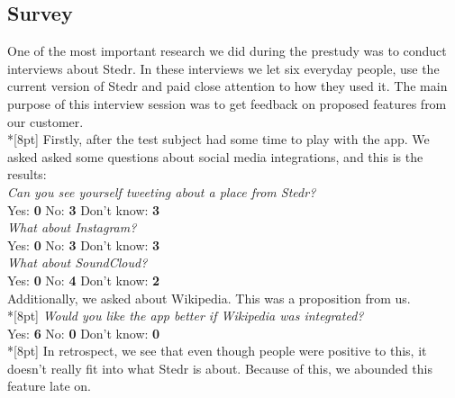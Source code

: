 		
	\subsection{Survey}


	One of the most important research we did during the prestudy was to conduct interviews about Stedr. In these interviews we let six everyday people, use the current version of Stedr and paid close attention to how they used it. The main purpose of this interview session was to get feedback on proposed features from our customer.\\*[8pt]
	Firstly, after the test subject had some time to play with the app. We asked asked some questions about social media integrations, and this is the results:\\

	\emph{Can you see yourself tweeting about a place from Stedr?}\\
	Yes: \textbf{0}\hspace{0.5cm}
	No: \textbf{3}\hspace{0.5cm}
	Don't know: \textbf{3}\\[6pt]
	
	\emph{What about Instagram?}\\
	Yes: \textbf{0}\hspace{0.5cm}
	No: \textbf{3}\hspace{0.5cm}
	Don't know: \textbf{3}\\[6pt]
	
	\emph{What about SoundCloud?}\\
	Yes: \textbf{0}\hspace{0.5cm}
	No: \textbf{4}\hspace{0.5cm}
	Don't know: \textbf{2}\hspace{0.5cm}\\[6pt]

	Additionally, we asked about Wikipedia. This was a proposition from us.\\*[8pt]
	\emph{Would you like the app better if Wikipedia was integrated?}\\
	Yes: \textbf{6}\hspace{0.5cm}
	No: \textbf{0}\hspace{0.5cm}
	Don't know:  \textbf{0}\\*[8pt]
	In retrospect, we see that even though people were positive to this, it doesn't really fit into what Stedr is about. Because of this, we abounded this feature late on.\\
	
